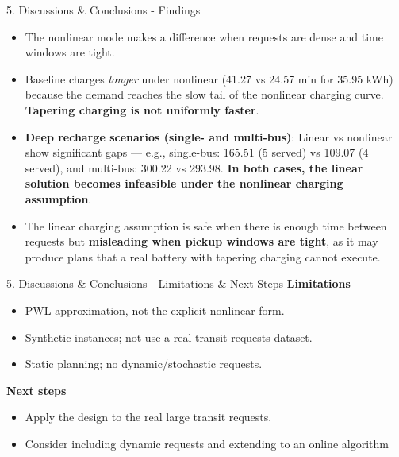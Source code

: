 \documentclass[10pt,aspectratio=169]{beamer}
\begin{document}
\begin{frame}{5. Discussions \& Conclusions - Findings}
\begin{itemize}\itemsep2pt
  \item The nonlinear mode makes a difference when requests are dense and time windows are tight.
  \item Baseline charges \emph{longer} under nonlinear (41.27 vs 24.57 min for 35.95 kWh) because the demand reaches the slow tail of the nonlinear charging curve. \textbf{Tapering charging is not uniformly faster}.
  \item \textbf{Deep recharge scenarios (single- and multi-bus)}: Linear vs nonlinear show significant gaps --- e.g., single-bus: 165.51 (5 served) vs 109.07 (4 served), and multi-bus: 300.22 vs 293.98. \alert{\textbf{In both cases, the linear solution becomes infeasible under the nonlinear charging assumption}}.
  \item The linear charging assumption is safe when there is enough time between requests but \textbf{misleading when pickup windows are tight}, as it may produce plans that a real battery with tapering charging cannot execute.
\end{itemize}
\end{frame}

\begin{frame}{5. Discussions \& Conclusions - Limitations \& Next Steps}
\textbf{Limitations}
\begin{itemize}\itemsep2pt
  \item PWL approximation, not the explicit nonlinear form.
  \item Synthetic instances; not use a real transit requests dataset.
  \item Static planning; no dynamic/stochastic requests.
\end{itemize}

\vspace{4pt}
\textbf{Next steps}
\begin{itemize}\itemsep2pt
  \item Apply the design to the real large transit requests.
  \item Consider including dynamic requests and extending to an online algorithm
\end{itemize}
\end{frame}
\end{document}
